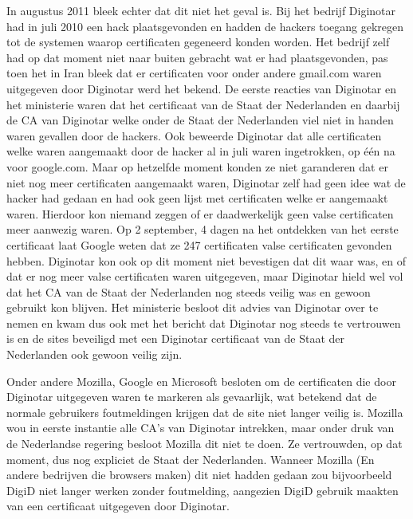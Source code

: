 In augustus 2011 bleek echter dat dit niet het geval is\cite{bib.webwereld.diginotar1}. Bij het bedrijf Diginotar had in juli 2010 een hack plaatsgevonden en hadden de hackers toegang gekregen tot de systemen waarop certificaten gegeneerd konden worden. Het bedrijf zelf had op dat moment niet naar buiten gebracht wat er had plaatsgevonden, pas toen het in Iran bleek dat er certificaten voor onder andere gmail.com waren uitgegeven door Diginotar werd het bekend. De eerste reacties van Diginotar en het ministerie waren dat het certificaat van de Staat der Nederlanden en daarbij de CA van Diginotar welke onder de Staat der Nederlanden viel niet in handen waren gevallen door de hackers. Ook beweerde Diginotar dat alle certificaten welke waren aangemaakt door de hacker al in juli waren ingetrokken, op \'{e}\'{e}n na voor google.com\cite{bib.webwereld.diginotar2}. Maar op hetzelfde moment konden ze niet garanderen dat er niet nog meer certificaten aangemaakt waren, Diginotar zelf had geen idee wat de hacker had gedaan en had ook geen lijst met certificaten welke er aangemaakt waren. Hierdoor kon niemand zeggen of er daadwerkelijk geen valse certificaten meer aanwezig waren. Op 2 september, 4 dagen na het ontdekken van het eerste certificaat laat Google weten dat ze 247 certificaten valse certificaten gevonden hebben\cite{bib.webwereld.diginotar3}. Diginotar kon ook op dit moment niet bevestigen dat dit waar was, en of dat er nog meer valse certificaten waren uitgegeven, maar Diginotar hield wel vol dat het CA van de Staat der Nederlanden nog steeds veilig was en gewoon gebruikt kon blijven. Het ministerie besloot dit advies van Diginotar over te nemen en kwam dus ook met het bericht dat Diginotar nog steeds te vertrouwen is en de sites beveiligd met een Diginotar certificaat van de Staat der Nederlanden ook gewoon veilig zijn.

Onder andere Mozilla, Google en Microsoft besloten om de certificaten die door Diginotar uitgegeven waren te markeren als gevaarlijk, wat betekend dat de normale gebruikers foutmeldingen krijgen dat de site niet langer veilig is. Mozilla wou in eerste instantie alle CA's van Diginotar intrekken, maar onder druk van de Nederlandse regering besloot Mozilla dit niet te doen. Ze vertrouwden, op dat moment, dus nog expliciet de Staat der Nederlanden. Wanneer Mozilla (En andere bedrijven die browsers maken) dit niet hadden gedaan zou bijvoorbeeld DigiD niet langer werken zonder foutmelding, aangezien DigiD gebruik maakten van een certificaat uitgegeven door Diginotar.


